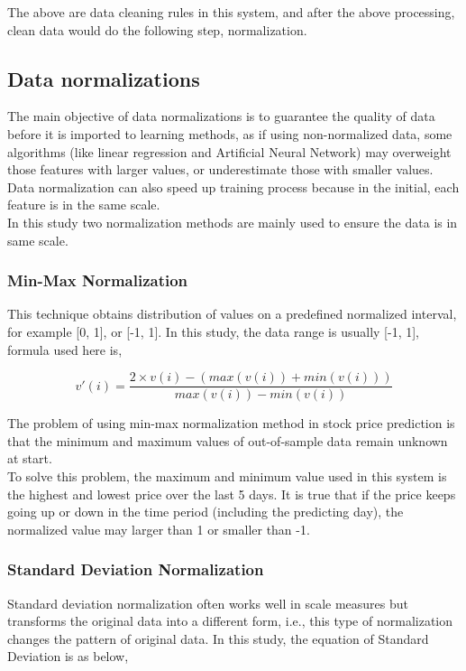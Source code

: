 The above are data cleaning rules in this system, and after the above processing, clean data would do the following step, normalization.

\subsection{Data normalizations}


The main objective of data normalizations is to guarantee the quality of data before it is imported to learning methods, as if using non-normalized data, some algorithms (like linear regression and Artificial Neural Network) may overweight those features with larger values, or underestimate those with smaller values. Data normalization can also speed up training process because in the initial, each feature is in the same scale.\\

In this study two normalization methods are mainly used to ensure the data is in same scale.


\subsubsection{Min-Max Normalization}
This technique obtains distribution of values on a predefined normalized interval, for example [0, 1], or [-1, 1]. In this study, the data range is usually [-1, 1], formula used here is\cite{nayak2014impact},


\begin{equation}
v'(i)=\frac{2\times v(i)- (max(v(i))+min(v(i)))}{max(v(i))-min(v(i))}
\end{equation}


The problem of using min-max normalization method in stock price prediction is that the minimum and maximum values of out-of-sample data remain unknown at start. \\

To solve this problem, the maximum and minimum value used in this system is the highest and lowest price over the last 5 days. It is true that if the price keeps going up or down in the time period (including the predicting day), the normalized value may larger than 1 or smaller than -1.


\subsubsection{Standard Deviation Normalization}


Standard deviation normalization often works well in scale measures but transforms the original data into a different form, i.e., this type of normalization changes the pattern of original data. In this study, the equation of Standard Deviation is as below\cite{nayak2014impact},

